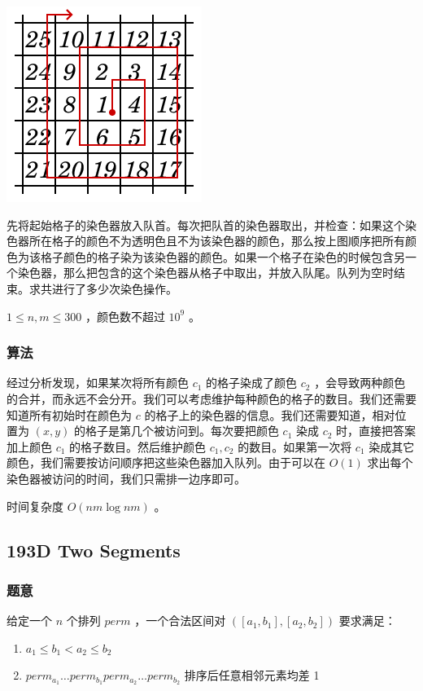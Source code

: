 \documentclass[11pt]{article}
\begin{document}
\includegraphics[scale = 0.5]{pic/105D.png}

    先将起始格子的染色器放入队首。每次把队首的染色器取出，并检查：如果这个染色器所在格子的颜色不为透明色且不为该染色器的颜色，那么按上图顺序把所有颜色为该格子颜色的格子染为该染色器的颜色。如果一个格子在染色的时候包含另一个染色器，那么把包含的这个染色器从格子中取出，并放入队尾。队列为空时结束。求共进行了多少次染色操作。

    $1 \leq n, m \leq 300$ ，颜色数不超过 $10^9$ 。
\subsubsection{算法}
\label{sec-5-4-2}

    经过分析发现，如果某次将所有颜色 $c_1$ 的格子染成了颜色 $c_2$ ，会导致两种颜色的合并，而永远不会分开。我们可以考虑维护每种颜色的格子的数目。我们还需要知道所有初始时在颜色为 $c$ 的格子上的染色器的信息。我们还需要知道，相对位置为 $(x, y)$ 的格子是第几个被访问到。每次要把颜色 $c_1$ 染成 $c_2$ 时，直接把答案加上颜色 $c_1$ 的格子数目。然后维护颜色 $c_1, c_2$ 的数目。如果第一次将 $c_1$ 染成其它颜色，我们需要按访问顺序把这些染色器加入队列。由于可以在 $O(1)$ 求出每个染色器被访问的时间，我们只需排一边序即可。

    时间复杂度 $O(nm \log nm)$ 。
\subsection{193D  Two Segments}
\label{sec-5-5}
\subsubsection{题意}
\label{sec-5-5-1}

    给定一个 $n$ 个排列 $perm$ ，一个合法区间对 $([a_1, b_1], [a_2, b_2])$ 要求满足：
\begin{enumerate}
\item $a_1 \leq b_1 < a_2 \leq b_2$
\item $perm_{a_1} \dots perm_{b_1} perm_{a_2} \dots perm_{b_2}$ 排序后任意相邻元素均差 1
\end{enumerate}
\end{document}
